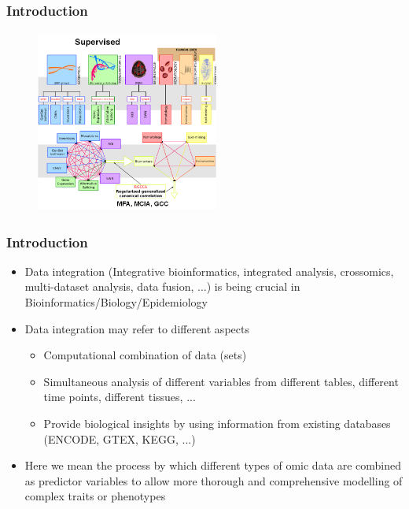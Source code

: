 \documentclass[10pt,xcolor=dvipsnames]{beamer}\usepackage[]{graphicx}\usepackage[]{color}
\begin{document}
\begin{frame}\frametitle{Introduction}

\begin{figure}
\begin{center}
 \includegraphics[height=6cm, width=6cm]{figures/supervised_multi_omic.png}
\end{center}
\end{figure}

\end{frame}




\begin{frame}\frametitle{Introduction}

\begin{itemize}
\item Data integration (Integrative bioinformatics, integrated 
analysis, crossomics, multi-dataset analysis, data fusion, ...) is being crucial in Bioinformatics/Biology/Epidemiology
\item Data integration may refer to different aspects
  \begin{itemize}
   \item Computational combination of data (sets)
   \item Simultaneous analysis of different variables from different tables, different time points, different tissues, ...
   \item Provide biological insights by using information from existing databases (ENCODE, GTEX, KEGG, ...)
  \end{itemize}
\item Here we mean the process by which different types of omic data are combined as predictor 
variables to allow more thorough and comprehensive modelling of complex traits or phenotypes
\end{itemize}
\end{frame}
\end{document}
